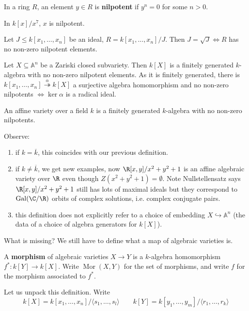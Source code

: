 \documentclass{article}
\newcommand{\A}{\mathbb{A}}
\DeclareMathOperator{\Mor}{Mor}
\DeclareMathOperator{\Gal}{Gal}
\begin{document}
\begin{defi}[Nilpotent]
    In a ring $R$, an element $y \in R$ is \textbf{nilpotent} if $y^n = 0$ for some $n > 0$.
\end{defi}
\begin{eg}
    In $k[x]/x^7$, $x$ is nilpotent.
\end{eg}
\begin{ex}
    Let $J \leq k[x_1, \dotsc, x_n]$ be an ideal, $R = k[x_1, \dotsc, x_n]/J$. Then $J = \sqrt{J} \iff R$ has no non-zero nilpotent elements.
\end{ex}
\begin{cor}
    Let $X \subseteq \A^n$ be a Zariski closed subvariety.
    Then $k[X]$ is a finitely generated $k$-algebra with no non-zero nilpotent elements.
    As it is finitely generated, there is $k[x_1, \dotsc, x_n] \overset{\alpha}{\twoheadrightarrow}k[X]$ a surjective algebra homomorphism and no non-zero nilpotents $\iff \ker \alpha$ is a radical ideal.
\end{cor}
\begin{defi}
    An affine variety over a field $k$ is a finitely generated $k$-algebra with no non-zero nilpotents.
\end{defi}
Observe:
\begin{enumerate}[label=(\roman*)]
    \item if $k = \overline{k}$, this coincides with our previous definition.
    \item if $k \neq \overline{k}$, we get new examples, now $\R[x,y]/x^2 + y^2 + 1$ is an affine algebraic variety over $\R$ even though $Z(x^2 + y^2 + 1) = \emptyset$.
        Note Nullstellensatz says $\R[x,y]/x^2 + y^2 + 1$ still has lots of maximal ideals but they correspond to $\Gal(\C/\R)$ orbits of complex solutions, i.e. complex conjugate pairs.
    \item this definition does not explicitly refer to a choice of embedding $X \hookrightarrow \A^n$ (the data of a choice of algebra generators for $k[X]$).
\end{enumerate}
What is missing? We still have to define what a map of algebraic varieties is.
\begin{defi}[Morphism]
    A \textbf{morphism} of algebraic varieties $X \to Y$ is a $k$-algebra homomorphism $f^*: k[Y] \to k[X]$. Write $\Mor(X, Y)$ for the set of morphisms, and write $f$ for the morphism associated to $f^*$.
\end{defi}
Let us unpack this definition.
Write
\begin{equation*}
    k[X] = k[x_1, \dotsc, x_n] / \langle s_1, \dotsc, s_l \rangle \qquad k[Y] = k[y_1, \dotsc, y_m] / \langle r_1, \dotsc, r_k \rangle
\end{equation*}
\end{document}
